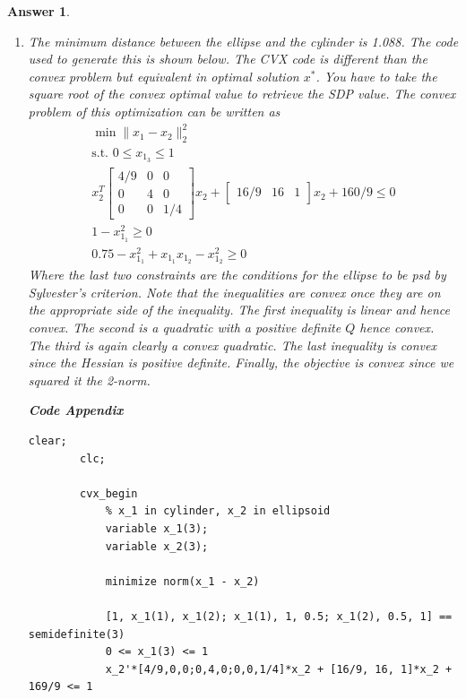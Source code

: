 \documentclass[12pt]{article}
\theoremstyle{colon}
\newtheorem*{answer}{Answer}
\begin{document}
\begin{answer}
  \leavevmode
  \begin{enumerate}[label=\arabic*)]
    \item The minimum distance between the ellipse and the cylinder is 1.088. The code used to generate this is shown below. The CVX code is different than the convex problem but equivalent in optimal solution $x^*$. You have to take the square root of the convex optimal value to retrieve the SDP value. The convex problem of this optimization can be written as
      \begin{gather*}
        \min \lVert x_1 - x_2 \rVert_2^2 \\
        \text{s.t. } 0 \leq x_{1_3} \leq 1 \\
        x_2^T \begin{bmatrix}
          4/9 & 0 & 0 \\
          0 & 4 & 0 \\
          0 & 0 & 1/4
        \end{bmatrix} x_2 + \begin{bmatrix}
          16/9 & 16 & 1
        \end{bmatrix} x_2 + 160/9 \leq 0 \\
        1 - x_{1_1}^2 \geq 0 \\
        0.75 - x_{1_1}^2 + x_{1_1} x_{1_2} - x_{1_2}^2 \geq 0
      \end{gather*}
      Where the last two constraints are the conditions for the ellipse to be psd by Sylvester's criterion. Note that the inequalities are convex once they are on the appropriate side of the inequality. The first inequality is linear and hence convex. The second is a quadratic with a positive definite $Q$ hence convex. The third is again clearly a convex quadratic. The last inequality is convex since the Hessian is positive definite. Finally, the objective is convex since we squared it the 2-norm.

      \textbf{Code Appendix}

      \begin{lstlisting}[style=Matlab-editor, basicstyle=\scriptsize]
        clear;
        clc;

        cvx_begin
            % x_1 in cylinder, x_2 in ellipsoid
            variable x_1(3);
            variable x_2(3);

            minimize norm(x_1 - x_2)

            [1, x_1(1), x_1(2); x_1(1), 1, 0.5; x_1(2), 0.5, 1] == semidefinite(3)
            0 <= x_1(3) <= 1
            x_2'*[4/9,0,0;0,4,0;0,0,1/4]*x_2 + [16/9, 16, 1]*x_2 + 169/9 <= 1


\end{lstlisting}
\end{enumerate}
\end{answer}
\end{document}
